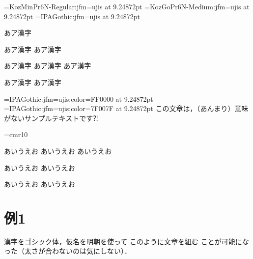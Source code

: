 \documentclass{ltjsarticle}
\begin{document}
\jfont\jaA={KozMinPr6N-Regular:jfm=ujis} at 9.24872pt
\jfont\jaB={KozGoPr6N-Medium:jfm=ujis}   at 9.24872pt
\jfont\jaC={IPAGothic:jfm=ujis}          at 9.24872pt

\jaA 
あア漢字%

\ltjdeclarealtfont\jaA{}
あア漢字%
\ltjdeclarealtfont\jaA{}
あア漢字%

\ltjdeclarealtfont\jaA{}
\ltjdeclarealtfont\jaA{}
あア漢字%
\mc
あア漢字%
\jaA 
あア漢字%

\jaA 
あア漢字%
\ltjclearaltfont\jaA
あア漢字%

\jfont\jaR={IPAGothic:jfm=ujis;color=FF0000} at 9.24872pt
\jfont\jaP={IPAGothic:jfm=ujis;color=7F007F} at 9.24872pt
\jaA 
\ltjdeclarealtfont\jaA{}
\ltjdeclarealtfont\jaA{}
この文章は，（あんまり）意味がないサンプルテキストです⁈

\scrollmode
\font\g=cmr10
\ltjdeclarealtfont\jaA{}%
\ltjdeclarealtfont\g{}%
\errorstopmode


\mc
あいうえお%
\selectfont あいうえお%
{\Large  あいうえお}

{%
}%
\selectfont あいうえお%
{\Large  あいうえお}

{\Large  あいうえお}%
あいうえお%

\section{例1}


{\Large\gt 
漢字をゴシック体，仮名を明朝を使って
{\selectfont このように文章を組む}
ことが可能になった（太さが合わないのは気にしない）．}
\end{document}
